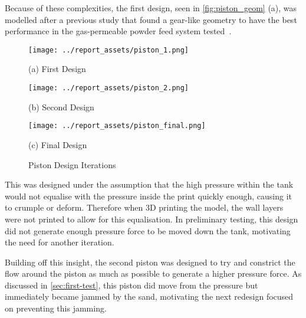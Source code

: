 Because of these complexities, the first design, seen in \autoref{fig:piston_geom} (a), was modelled after a previous study that found a gear-like geometry to have the best performance in the gas-permeable powder feed system tested~\cite{TANG2023118406}. 
\begin{figure}[htbp]
    \centering
    
    \begin{minipage}{0.3\textwidth}
        \centering
        \texttt{[image: ../report\_assets/piston\_1.png]}
        \caption*{(a) First Design}\label{fig:piston_geom_1}
    \end{minipage}
    \hfill
    \begin{minipage}{0.3\textwidth}
        \centering
        \texttt{[image: ../report\_assets/piston\_2.png]}
        \caption*{(b) Second Design}\label{fig:piston_geom_2}
    \end{minipage}
    \hfill
    \begin{minipage}{0.3\textwidth}
        \centering
        \texttt{[image: ../report\_assets/piston\_final.png]}
        \caption*{(c) Final Design}\label{fig:piston_geom_3}
    \end{minipage}
    \caption{Piston Design Iterations}\label{fig:piston_geom}
\end{figure}
This was designed under the assumption that the high pressure within the tank would not equalise with the pressure inside the print quickly enough, causing it to crumple or deform. Therefore when 3D printing the model, the wall layers were not printed to allow for this equalisation. In preliminary testing, this design did not generate enough pressure force to be moved down the tank, motivating the need for another iteration.

Building off this insight, the second piston was designed to try and constrict the flow around the piston as much as possible to generate a higher pressure force. As discussed in \autoref{sec:first-test}, this piston did move from the pressure but immediately became jammed by the sand, motivating the next redesign focused on preventing this jamming.

